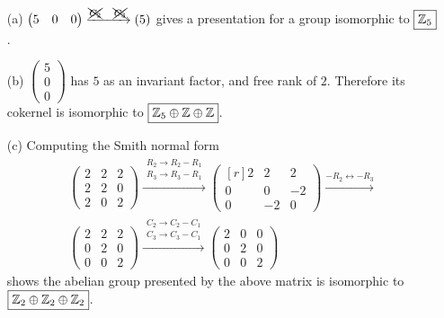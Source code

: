 \documentclass[../algebraNotesMSRI-UP2016.tex]{subfiles}
\begin{document}
\begin{frame}
\begin{itemize}
\item[(a)] $\begin{pmatrix}
	5 & 0 & 0 
	\end{pmatrix}\xrightarrow{\xcancel{C_2} \quad \xcancel{C_3}} (5)$ gives a presentation for a group isomorphic to $\boxed{\mathbb Z_5}$.

\smallGap
\item[(b)] $\begin{pmatrix}
5 \\
0 \\
0
\end{pmatrix}$ has $5$ as an invariant factor, and free rank of $2$.  Therefore its cokernel is isomorphic to $\boxed{\mathbb Z_5\oplus\mathbb Z\oplus\mathbb Z}$.

\smallGap
\item[(c)] Computing the Smith normal form 
\begin{multline*}\begin{pmatrix}
	2 & 2 & 2 \\
	2 & 2 & 0 \\
	2 & 0 & 2
	\end{pmatrix} \xrightarrow{\substack{R_2\to R_2-R_1 \\ R_3\to R_3-R_1}}
\begin{pmatrix*}[r]
2 & 2 & 2 \\
0 & 0 & -2 \\
0 & -2 & 0 
\end{pmatrix*} \xrightarrow{-R_2\leftrightarrow -R_3} \\
\begin{pmatrix}
2 & 2 & 2 \\
0 & 2 & 0 \\
0 & 0 & 2
\end{pmatrix} \xrightarrow{\substack{C_2\to C_2-C_1 \\ C_3\to C_3-C_1  }}
\begin{pmatrix}
2 & 0 & 0 \\
0 & 2 & 0 \\
0 & 0 & 2
\end{pmatrix}	
\end{multline*}
shows the abelian group presented by the above matrix is isomorphic to $\boxed{\mathbb Z_2\oplus \mathbb Z_2 \oplus \mathbb Z_2}$.
\end{itemize}
\end{frame}
\end{document}
